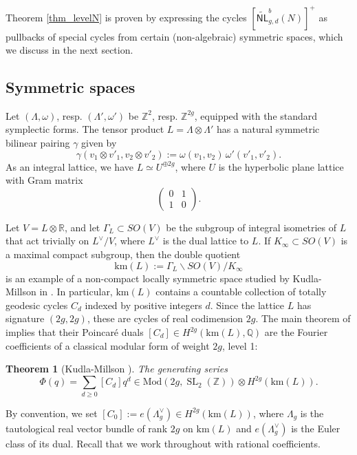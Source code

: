 \documentclass[12pt]{amsart}
\def\bQ{\mathbb{Q}}
\def\bR{\mathbb{R}}
\def\bZ{\mathbb{Z}}
\DeclareMathOperator{\SL}{SL}
\newcommand{\Mod}{\mathrm{Mod}}
\newcommand{\bs}{\backslash}
\newcommand{\wNL}{{\widetilde{\mathsf{NL}}}}
\newcommand{\km}{\mathrm{km}}
\newtheorem{thm}{Theorem}[section]
\theoremstyle{definition}
\begin{document}
Theorem \ref{thm_levelN} is proven by expressing the cycles $[\wNL^b_{g,d}(N)]^+$ as pullbacks of special cycles from certain (non-algebraic) symmetric spaces, which we discuss in the next section.

\subsection{Symmetric spaces}
Let $(\Lambda,\omega)$, resp. $(\Lambda',\omega')$ be $\bZ^2$, resp. $\bZ^{2g}$, equipped with the standard symplectic forms. The tensor product $L=\Lambda\otimes \Lambda'$ has a natural symmetric bilinear pairing $\gamma$ given by
\begin{equation*}
    \gamma(v_1\otimes v'_1, v_2\otimes v'_2):= \omega(v_1,v_2)\,\omega'(v'_1,v'_2). 
\end{equation*}
As an integral lattice, we have $L\simeq U^{\oplus 2g}$, where $U$ is the hyperbolic plane lattice with Gram matrix
\begin{equation*}
\begin{pmatrix}  0 & 1 \\ 1 & 0 \end{pmatrix}.
\end{equation*}

Let $V=L\otimes \bR$, and let $\Gamma_L\subset SO(V)$ be the subgroup of integral isometries of $L$ that act trivially on $L^\vee/V$, where $L^\vee$ is the dual lattice to $L$. If $K_\infty\subset SO(V)$ is a maximal compact subgroup, then the double quotient
\begin{equation*}
\km(L) := \Gamma_L\bs SO(V)/K_\infty
\end{equation*}
is an example of a non-compact locally symmetric space studied by Kudla-Millson in \cite{km}. In particular, $\km(L)$ contains a countable collection of totally geodesic cycles $C_d$ indexed by positive integers $d$. Since the lattice $L$ has signature $(2g,2g)$, these are cycles of real codimension $2g$. The main theorem of \cite{km} implies that their Poincar\'{e} duals $[C_d]\in H^{2g}(\km(L),\bQ)$ are the Fourier coefficients of a classical modular form of weight $2g$, level 1:
\begin{thm}[Kudla-Millson \cite{km}]
The generating series
\begin{equation*}
  \Phi(q)=\sum_{d\geq 0} [C_d]q^d \in \Mod(2g, \SL_2(\bZ))\otimes H^{2g}(\km(L)).
\end{equation*}
\end{thm}
By convention, we set $[C_0]:=e(\Lambda_g^\vee)\in H^{2g}(\km(L))$, where $\Lambda_g$ is the tautological real vector bundle of rank $2g$ on $\km(L)$ and $e(\Lambda_g^\vee)$ is the Euler class of its dual. Recall that we work throughout with rational coefficients.
\end{document}

